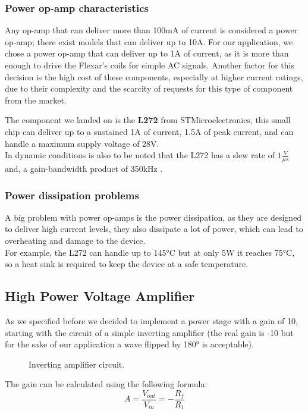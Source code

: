 \subsubsection{Power op-amp characteristics}
Any op-amp that can deliver more than 100mA of current is considered a power op-amp; there exist models that can deliver up to 10A.
For our application, we chose a power op-amp that can deliver up to 1A of current, as it is more than enough to drive the Flexar's coils for simple AC signals.
Another factor for this decision is the high cost of these components, especially at higher current ratings, due to their complexity and the scarcity of requests for this type of component from the market.

The component we landed on is the \textbf{L272} from STMicroelectronics, this small chip can deliver up to a sustained 1A of current, 1.5A of peak current, and can handle a maximum supply voltage of 28V. \\
In dynamic conditions is also to be noted that the L272 has a slew rate of $1\frac{V}{\mu s}$ and, a gain-bandwidth product of 350kHz \cite{L272}.
\subsubsection{Power dissipation problems}
A big problem with power op-amps is the power dissipation, as they are designed to deliver high current levels, they also dissipate a lot of power, which can lead to overheating and damage to the device. \\
For example, the L272 can handle up to 145°C but at only 5W it reaches 75°C, so a heat sink is required to keep the device at a safe temperature.

\subsection{High Power Voltage Amplifier}
As we specified before we decided to implement a power stage with a gain of 10, starting with the circuit of a simple inverting amplifier (the real gain is -10 but for the sake of our application a wave flipped by 180° is acceptable).

\begin{figure}
    \centering
    \resizebox{.7\linewidth}{!}{}
    \caption{Inverting amplifier circuit.}
    \label{fig:non-inv_ampl}
\end{figure}

The gain can be calculated using the following formula:
\begin{equation}
    A = \frac{V_{out}}{V_{in}} = -\frac{R_f}{R_1}
\end{equation}

